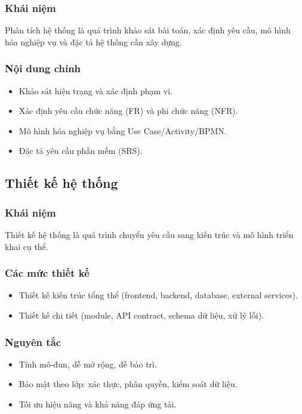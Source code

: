 \documentclass[13pt]{article}
\begin{document}
\subsubsection{Khái niệm}
Phân tích hệ thống là quá trình khảo sát bài toán, xác định yêu cầu, mô hình hóa nghiệp vụ
và đặc tả hệ thống cần xây dựng.

\subsubsection{Nội dung chính}
\begin{itemize}
    \item Khảo sát hiện trạng và xác định phạm vi.
    \item Xác định yêu cầu chức năng (FR) và phi chức năng (NFR).
    \item Mô hình hóa nghiệp vụ bằng Use Case/Activity/BPMN.
    \item Đặc tả yêu cầu phần mềm (SRS).
\end{itemize}

\subsection{Thiết kế hệ thống}
\subsubsection{Khái niệm}
Thiết kế hệ thống là quá trình chuyển yêu cầu sang kiến trúc và mô hình triển khai cụ thể.

\subsubsection{Các mức thiết kế}
\begin{itemize}
    \item Thiết kế kiến trúc tổng thể (frontend, backend, database, external services).
    \item Thiết kế chi tiết (module, API contract, schema dữ liệu, xử lý lỗi).
\end{itemize}

\subsubsection{Nguyên tắc}
\begin{itemize}
    \item Tính mô-đun, dễ mở rộng, dễ bảo trì.
    \item Bảo mật theo lớp: xác thực, phân quyền, kiểm soát dữ liệu.
    \item Tối ưu hiệu năng và khả năng đáp ứng tải.
\end{itemize}
\end{document}
